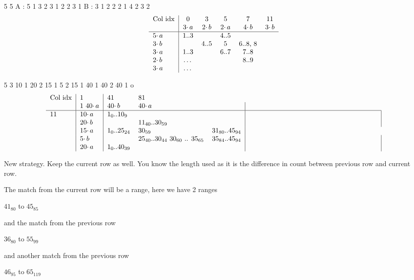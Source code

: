 \documentclass{article}
\begin{document}
5 5 
A : 5 1  3 2   3 1   2 2   3 1
B : 3 1  2 2   2 1   4 2   3 2
\newline 
\[  \begin{tabular} {l | *{10}{c}}
Col idx & 0 & 3 & 5 & 7 & 11  \\
& $3 \cdotp a$ & $2 \cdotp b$ & $2 \cdotp a$ & $4 \cdotp b$ & $3 \cdotp b$  \\
\hline 
$5 \cdotp a$  & 1..3  &     & 4..5  &    \\
$3 \cdotp b$  &       & 4..5 &  5   & 6..8, 8 \\
$3 \cdotp a$  & 1..3  &     & 6..7 & 7..8 \\
$2 \cdotp b$  & \dots  &     &      & 8..9   \\
$3 \cdotp a$  & \dots  &     &      &    \\
\end{tabular} \]


5 3
10 1   20 2    15 1    5 2   15 1
40 1   40 2    40 1 
o
\newline 
\[ \begin{tabular} {l | l | *{3}{l} | p{66mm} | }
Col idx & 1 & 41 & 81   \\
& 1 $40 \cdotp a$ & $40 \cdotp b$ & $40 \cdotp a$ &   \\
\hline 
11 & $10 \cdotp a$  & $1_{0}$..$10_{9}$  &     &   &    \\
 & $20 \cdotp b$  &       & $11_{40}$..$30_{59}$ &     &  \\
& $15 \cdotp a$  & $1_{0}$..$25_{24}$  & $30_{59}$  & $31_{80}$..$45_{94}$ \\
& $5 \cdotp b$  &  & $25_{40}$..$30_{44}$  $30_{60}$ .. $35_{65}$ &  $35_{84}$..$45_{94}$    &   \\
& $20 \cdotp a$  & $1_{0}$..$40_{39}$   &     &      &    \\
\end{tabular} \]


New strategy.  Keep the current row as well.  You know the length used as it is 
the difference in count between previous row and current row.

The match from the current row will be a range, here we have 2 ranges

$41_{80}$ to $45_{85}$

and the match from the previous row

$36_{80}$ to $55_{99}$

and another match from the previous row

$46_{95}$  to $65_{119}$
\end{document}

